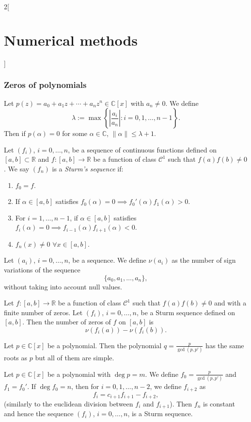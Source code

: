 \documentclass[class=article,10pt,crop=false]{standalone}
\begin{document}
\begin{multicols}{2}[\section{Numerical methods}]
\subsubsection*{Zeros of polynomials}
\begin{lemma}
Let $p(z)=a_0+a_1z+\cdots+a_nz^n\in\mathbb{C}[x]$ with $a_n\ne 0$. We define $$\lambda:=\max\left\{\left|\frac{a_i}{a_n}\right|:i=0,1,\ldots,n-1\right\}.$$ Then if $p(\alpha)=0$ for some $\alpha\in\mathbb{C}$, $\|\alpha\|\leq\lambda+1$.
\end{lemma}
\begin{definition}
Let $(f_i)$, $i=0,\ldots,n$, be a sequence of continuous functions defined on $[a,b]\subset\mathbb{R}$ and $f:[a,b]\rightarrow\mathbb{R}$ be a function of class $\mathcal{C}^1$ such that $f(a)f(b)\ne 0$. We say $(f_n)$ is a \textit{Sturm's sequence} if:
\begin{enumerate}
    \item $f_0=f$.
    \item If $\alpha\in[a,b]$ satisfies $f_0(\alpha)=0\implies f_0'(\alpha)f_1(\alpha)>0$.
    \item For $i=1,\ldots,n-1$, if $\alpha\in[a,b]$ satisfies $f_i(\alpha)=0\implies f_{i-1}(\alpha)f_{i+1}(\alpha)<0$.
    \item $f_n(x)\ne0$ $\forall x\in[a,b]$.
\end{enumerate}
\end{definition}
\begin{definition}
Let $(a_i)$, $i=0,\ldots,n$, be a sequence. We define $\nu(a_i)$ as the number of sign variations of the sequence $$\{a_0,a_1,\ldots,a_n\},$$ without taking into account null values. 
\end{definition}
\begin{theorem}
Let $f:[a,b]\rightarrow\mathbb{R}$ be a function of class $\mathcal{C}^1$ such that $f(a)f(b)\ne 0$ and with a finite number of zeros. Let $(f_i)$, $i=0,\ldots,n$, be a Sturm sequence defined on $[a,b]$. Then the number of zeros of $f$ on $[a,b]$ is $$\nu\left(f_i(a)\right)-\nu\left(f_i(b)\right).$$
\end{theorem}
\begin{lemma}
Let $p\in\mathbb{C}[x]$ be a polynomial. Then the polynomial $\displaystyle q=\frac{p}{\gcd(p,p')}$ has the same roots as $p$ but all of them are simple.
\end{lemma}
\begin{prop}
Let $p\in\mathbb{C}[x]$ be a polynomial with $\deg p=m$. We define $\displaystyle f_0=\frac{p}{\gcd(p,p')}$ and $f_1=f_0'$. If $\deg f_0=n$, then for $i=0,1,\ldots,n-2$, we define $f_{i+2}$ as $$f_i=c_{i+1}f_{i+1}-f_{i+2},$$ (similarly to the euclidean division between $f_i$ and $f_{i+1}$). Then $f_n$ is constant and hence the sequence $(f_i)$, $i=0,\ldots,n$, is a Sturm sequence.

\end{prop}
\end{multicols}
\end{document}
